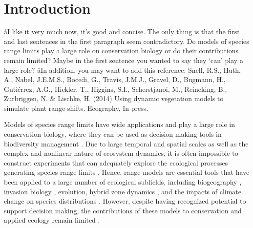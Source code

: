 \section*{Introduction}
\aa{I like it very much now, it's good and concise. The only thing is that the first and last sentences in the first paragraph seem contradictory. Do models of species range limits play a large role on conservation biology or do their contributions remain limited? Maybe in the first sentence you wanted to say they ‘can’ play a large role? }
\aa{In addition, you may want to add this reference: Snell, R.S., Huth, A., Nabel, J.E.M.S., Bocedi, G., Travis, J.M.J., Gravel, D., Bugmann, H., Gutiérrez, A.G., Hickler, T., Higgins, S.I., Scherstjanoi, M., Reineking, B., Zurbriggen, N. \& Lischke, H. (2014) Using dynamic vegetation models to simulate plant range shifts. Ecography, In press.}

Models of species range limits have wide applications and play a large role in conservation biology, where they can be used as decision-making tools in biodiversity management \citep{Rosenzweig2008, Thuiller2008, Rodenhouse2009}.
Due to large temporal and spatial scales as well as the complex and nonlinear nature of ecosystem dynamics, it is often impossible to construct experiments that can adequately explore the ecological processes generating species range limits \citep{Wu1995, Levin1998}. 
Hence, range models are essential tools that have been applied to a large number of ecological subfields, including biogeography \citep{Schurr2012}, invasion biology \citep{Catterall2012, Gallien2012}, evolution, hybrid zone dynamics \citep{Engler2013}, and the impacts of climate change on species distributions \citep{Rosenzweig2008, Thuiller2008, Milad2011, Blois2013, Loyola2013}. 
However, despite having recognized potential to support decision making, the contributions of these models to conservation and applied ecology remain limited \citep{Dawson2011, Guisan2013}.

